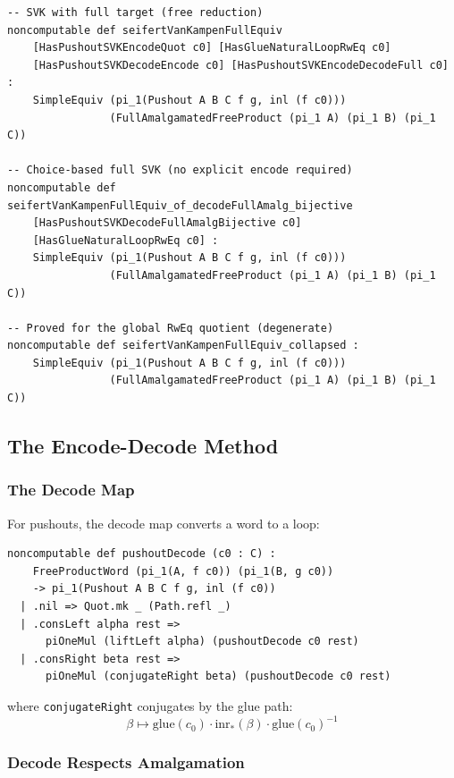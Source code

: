 \documentclass{lmcs}
\theoremstyle{definition}
\theoremstyle{plain}
\theoremstyle{remark}
\newcommand{\inr}{\mathrm{inr}}
\newcommand{\glmark}{\mathrm{glue}}
\begin{document}
\begin{lstlisting}
-- SVK with full target (free reduction)
noncomputable def seifertVanKampenFullEquiv
    [HasPushoutSVKEncodeQuot c0] [HasGlueNaturalLoopRwEq c0]
    [HasPushoutSVKDecodeEncode c0] [HasPushoutSVKEncodeDecodeFull c0] :
    SimpleEquiv (pi_1(Pushout A B C f g, inl (f c0)))
                (FullAmalgamatedFreeProduct (pi_1 A) (pi_1 B) (pi_1 C))

-- Choice-based full SVK (no explicit encode required)
noncomputable def seifertVanKampenFullEquiv_of_decodeFullAmalg_bijective
    [HasPushoutSVKDecodeFullAmalgBijective c0]
    [HasGlueNaturalLoopRwEq c0] :
    SimpleEquiv (pi_1(Pushout A B C f g, inl (f c0)))
                (FullAmalgamatedFreeProduct (pi_1 A) (pi_1 B) (pi_1 C))

-- Proved for the global RwEq quotient (degenerate)
noncomputable def seifertVanKampenFullEquiv_collapsed :
    SimpleEquiv (pi_1(Pushout A B C f g, inl (f c0)))
                (FullAmalgamatedFreeProduct (pi_1 A) (pi_1 B) (pi_1 C))
\end{lstlisting}

\subsection{The Encode-Decode Method}

\subsubsection{The Decode Map}

For pushouts, the decode map converts a word to a loop:
\begin{lstlisting}
noncomputable def pushoutDecode (c0 : C) :
    FreeProductWord (pi_1(A, f c0)) (pi_1(B, g c0))
    -> pi_1(Pushout A B C f g, inl (f c0))
  | .nil => Quot.mk _ (Path.refl _)
  | .consLeft alpha rest =>
      piOneMul (liftLeft alpha) (pushoutDecode c0 rest)
  | .consRight beta rest =>
      piOneMul (conjugateRight beta) (pushoutDecode c0 rest)
\end{lstlisting}

where \texttt{conjugateRight} conjugates by the glue path:
\[
\beta \mapsto \glmark(c_0) \cdot \inr_*(\beta) \cdot \glmark(c_0)^{-1}
\]

\subsubsection{Decode Respects Amalgamation}
\end{document}
